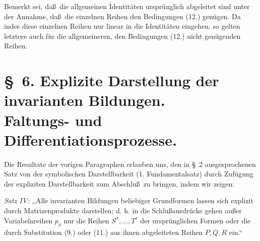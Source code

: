 \documentclass[11pt]{article}
\begin{document}
Bemerkt sei, da\ss\ die allgemeinen Identit\"aten urspr\"unglich abgeleitet sind unter der Annahme, da\ss\ die einzelnen Reihen den Bedingungen (12.) gen\"ugen. Da indes diese einzelnen Reihen nur linear in die Identit\"aten eingehen, so gelten letztere auch f\"ur die allgemeineren, den Bedingungen (12.) nicht gen\"ugenden Reihen.

\section*{\S\ 6. Explizite Darstellung der invarianten Bildungen.\\Faltungs- und Differentiationsprozesse.}
Die Resultate der vorigen Paragraphen erlauben uns, den in \S\ 2 ausgesprochenen Satz von der symbolischen Darstellbarkeit (1. Fundamentalsatz) durch Zuf\"ugung der expliziten Darstellbarkeit zum Abschlu\ss\ zu bringen, indem wir zeigen:

\emph{Satz IV:} ,,Alle invarianten Bildungen beliebiger Grundformen lassen sich explizit durch Matrizenprodukte darstellen; d. h. in die Schlu\ss ausdr\"ucke gehen au\ss er Variabelnreihen $p_\rho$ nur die Reihen $S^\sigma,\ldots,T^\tau$ der urspr\"unglichen Formen oder die durch Substitution (9.) oder (11.) aus ihnen abgeleiteten Reihen $P,Q,R$ ein.``
\end{document}
